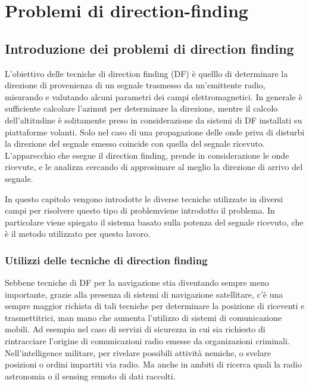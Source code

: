 \chapter{Problemi di direction-finding}
\section{Introduzione dei problemi di direction finding}

L'obiettivo delle tecniche di direction finding (DF) è quelllo di determinare la direzione di provenienza di un segnale trasmesso da un'emittente radio, misurando e valutando alcuni parametri dei campi elettromagnetici. In generale è sufficiente calcolare l'azimut per determinare la direzione, mentre il calcolo dell'altitudine è solitamente preso in considerazione da sistemi di DF installati su piattaforme volanti. Solo nel caso di una propagazione delle onde priva di disturbi la direzione del segnale emesso coincide con quella del segnale ricevuto. L'apparecchio che esegue il direction finding, prende in considerazione le onde ricevute, e le analizza cercando di approsimare al meglio la direzione di arrivo del segnale.

In questo capitolo vengono introdotte le diverse tecniche utilizzate in diversi campi per risolvere questo tipo di problemviene introdotto il problema. In particolare viene spiegato il sistema basato sulla potenza del segnale ricevuto, che è il metodo utilizzato per questo lavoro. 

\subsection{Utilizzi delle tecniche di direction finding}
Sebbene tecniche di DF per la navigazione stia diventando sempre meno importante, grazie alla presenza di sistemi di navigazione satellitare, c'è una sempre maggior richista di tali tecniche per determinare la posizione di riceventi e trasmettitrici, man mano che aumenta l'utilizzo di sistemi di comunicazione mobili. Ad esempio nel caso di servizi di sicurezza in cui sia richiesto di rintracciare l'origine di comunicazioni radio emesse da organizazioni criminali. Nell'intelligence militare, per rivelare possibili attività nemiche, o svelare posizioni o ordini impartiti via radio. Ma anche in ambiti di ricerca quali la radio astronomia o il sensing remoto di dati raccolti. 

